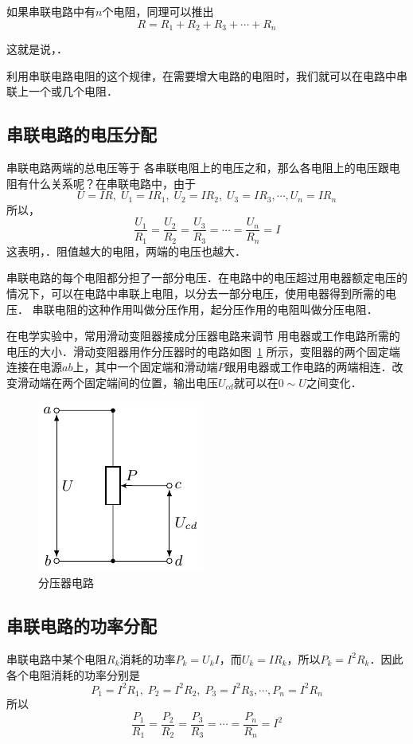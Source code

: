 如果串联电路中有$n$个电阻，同理可以推出
\[R=R_1+R_2+R_3+\cdots+R_n\]

这就是说，．

利用串联电路电阻的这个规律，在需要增大电路的电阻时，我们就可以在电路中串联上一个或几个电阻．

\subsection{串联电路的电压分配}
串联电路两端的总电压等于
各串联电阻上的电压之和，那么各电阻上的电压跟电阻有什么关系呢？在串联电路中，由于
\[U=IR,\;  U_1=IR_1,\; U_2=IR_2,\; U_3=IR_3,\cdots, U_n=IR_n\]
所以，
\[\frac{U_1}{R_1}=\frac{U_2}{R_2}=\frac{U_3}{R_3}=\cdots=\frac{U_n}{R_n}=I \]
这表明，．阻值越大的电阻，两端的电压也越大．

串联电路的每个电阻都分担了一部分电压．在电路中的电压超过用电器额定电压的情况下，可以在电路中串联上电阻，以分去一部分电压，使用电器得到所需的电压．
串联电阻的这种作用叫做分压作用，起分压作用的电阻叫做分压电阻．

在电学实验中，常用滑动变阻器接成分压器电路来调节
用电器或工作电路所需的电压的大小．滑动变阻器用作分压器时的电路如图~\ref{fig_B_7-7} 所示，变阻器的两个固定端连接在电源$ab$上，其中一个固定端和滑动端$P$跟用电器或工作电路的两端相连．改变滑动端在两个固定端间的位置，输出电压$U_{cd}$就可以在$0 \sim U$之间变化．
\begin{figure}[htbp]
	\centering
	\includegraphics{fig/B/7-7.pdf}
	\caption{分压器电路}\label{fig_B_7-7}
\end{figure}

\subsection{串联电路的功率分配} 串联电路中某个电阻$R_k$消耗的功率$P_k=U_kI$，而$U_k=IR_k$，所以$P_k=I^2R_k$．因此各个电阻消耗的功率分别是
\[P_1=I^2R_1,\; P_2=I^2R_2,\; P_3=I^2R_3,\cdots, P_n=I^2R_n\]
所以
\[\frac{P_1}{R_1}=\frac{P_2}{R_2}=\frac{P_3}{R_3}=\cdots=\frac{P_n}{R_n}=I^2 \]

